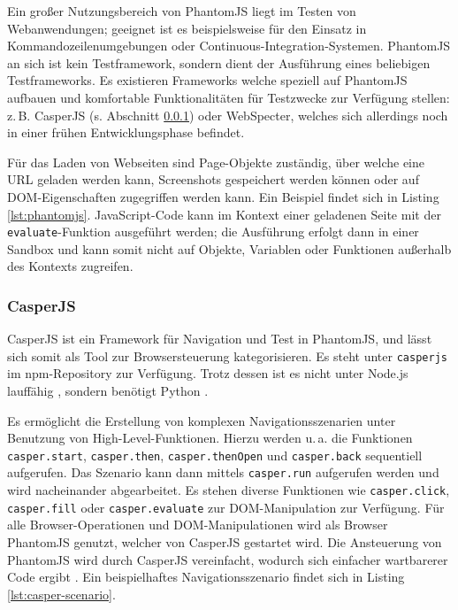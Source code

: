 Ein großer Nutzungsbereich von PhantomJS liegt im Testen von Webanwendungen; geeignet ist es beispielsweise für den Einsatz in Kommandozeilenumgebungen oder Continuous-Integration-Systemen. PhantomJS an sich ist kein Testframework, sondern dient der Ausführung eines beliebigen Testframeworks. Es existieren Frameworks welche speziell auf PhantomJS aufbauen und komfortable Funktionalitäten für Testzwecke zur Verfügung stellen: z.\,B. CasperJS (s. Abschnitt \ref{sec:CasperJS}) oder WebSpecter, welches sich allerdings noch in einer frühen Entwicklungsphase befindet. \cite{phantomjs-testing}

Für das Laden von Webseiten sind Page-Objekte zuständig, über welche eine URL geladen werden kann, Screenshots gespeichert werden können oder auf DOM-Eigenschaften zugegriffen werden kann. Ein Beispiel findet sich in Listing \ref{lst:phantomjs}. JavaScript-Code kann im Kontext einer geladenen Seite mit der \texttt{evaluate}-Funktion ausgeführt werden; die Ausführung erfolgt dann in einer Sandbox und kann somit nicht auf Objekte, Variablen oder Funktionen außerhalb des Kontexts zugreifen. \cite{phantomjs-quickstart}

\begin{figure}[H]
	
\end{figure}

\subsubsection{CasperJS}
\label{sec:CasperJS}
CasperJS ist ein Framework für Navigation und Test in PhantomJS, und lässt sich somit als Tool zur Browsersteuerung kategorisieren. Es steht unter \texttt{casperjs} im npm-Repository zur Verfügung. \cite{casperjs-index} Trotz dessen ist es nicht unter Node.js lauffähig \cite{casperjs-faq}, sondern benötigt Python \cite{casperjs-installation}.

Es ermöglicht die Erstellung von komplexen Navigationsszenarien unter Benutzung von High-Level-Funktionen. Hierzu werden u.\,a. die Funktionen \texttt{casper.start}, \texttt{casper.then}, \texttt{casper.thenOpen} und \texttt{casper.back} sequentiell aufgerufen. Das Szenario kann dann mittels \texttt{casper.run} aufgerufen werden und wird nacheinander abgearbeitet. Es stehen diverse Funktionen wie \texttt{casper.click}, \texttt{casper.fill} oder \texttt{casper.evaluate} zur DOM-Manipulation zur Verfügung. Für alle Browser-Operationen und DOM-Manipulationen wird als Browser PhantomJS genutzt, welcher von CasperJS gestartet wird. Die Ansteuerung von PhantomJS wird durch CasperJS vereinfacht, wodurch sich einfacher wartbarerer Code ergibt \cite{casperjs-better-phantomjs}. Ein beispielhaftes Navigationsszenario findet sich in Listing \ref{lst:casper-scenario}. \cite{casperjs-index}

